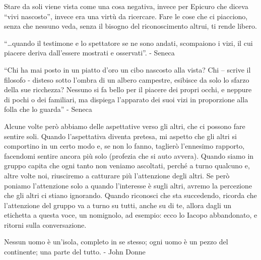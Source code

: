 \documentclass[12pt]{book} %
\begin{document}
Stare da soli viene vista come una cosa negativa, invece per Epicuro che diceva “vivi nascosto”, invece era una virtù da
ricercare. Fare le cose che ci piacciono, senza che nessuno veda, senza il bisogno del riconoscimento altrui, ti rende
libero.

“…quando il testimone e lo spettatore se ne sono andati, scompaiono i vizi, il cui piacere deriva dall’essere mostrati e osservati”. - Seneca

“Chi ha mai posto in un piatto d’oro un cibo nascosto alla vista? Chi – scrive il filosofo - disteso sotto l’ombra di un albero campestre, esibisce da solo lo sfarzo della sue ricchezza? Nessuno si fa bello per il piacere dei propri occhi, e neppure di pochi o dei familiari, ma dispiega l’apparato dei suoi vizi in proporzione alla folla che lo guarda” - Seneca

Alcune volte però abbiamo delle aspettative verso gli altri, che ci possono fare sentire soli. Quando
l'aspettativa diventa pretesa, mi aspetto che gli altri si comportino in un certo modo e, se non
lo fanno, taglierò l'ennesimo rapporto, facendomi sentire ancora più solo (profezia che si auto avvera). Quando siamo
in gruppo capita che ogni tanto non veniamo ascoltati, perché a turno qualcuno e, altre volte noi, riusciremo a
catturare più l'attenzione degli altri. Se però poniamo l'attenzione solo a
quando l'interesse è sugli altri, avremo la percezione che gli altri ci stiano ignorando. Quando
riconosci che sta succedendo, ricorda che l'attenzione del gruppo va a turno su tutti, anche su di
te, allora dagli un etichetta a questa voce, un nomignolo, ad esempio: ecco lo Iacopo abbandonato, e ritorni sulla
conversazione.


\bigskip

{\textquotedbl}Nessun uomo è un'isola, completo in se stesso; ogni uomo è un pezzo del continente; una parte del
tutto.{\textquotedbl} - John Donne 
\end{document}
